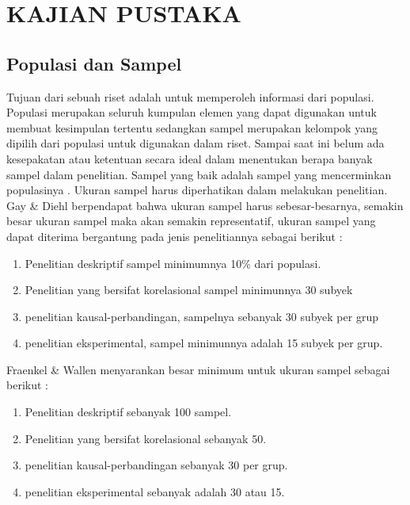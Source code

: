 
\chapter{KAJIAN PUSTAKA}                


\section{Populasi dan Sampel}
Tujuan dari sebuah riset adalah untuk memperoleh informasi dari populasi. Populasi merupakan seluruh kumpulan elemen yang dapat digunakan untuk membuat kesimpulan tertentu sedangkan sampel merupakan kelompok yang dipilih dari populasi untuk digunakan dalam riset. Sampai saat ini belum ada kesepakatan atau ketentuan secara ideal dalam menentukan berapa banyak sampel dalam penelitian. Sampel yang baik adalah sampel yang mencerminkan populasinya \citep{amirullah2015metode}. Ukuran sampel harus diperhatikan dalam melakukan penelitian. Gay \& Diehl berpendapat bahwa ukuran sampel harus sebesar-besarnya, semakin besar ukuran sampel maka akan semakin representatif, ukuran sampel yang dapat diterima bergantung pada jenis penelitiannya sebagai berikut \citep{gay1992research}:
\begin{enumerate}
	\item Penelitian deskriptif sampel minimumnya 10\% dari populasi.
	\item Penelitian yang bersifat korelasional sampel minimunnya 30 subyek
	\item penelitian kausal-perbandingan, sampelnya sebanyak 30 subyek per grup
	\item penelitian eksperimental, sampel minimunnya adalah 15 subyek per grup.
\end{enumerate}
Fraenkel \& Wallen menyarankan besar minimum untuk ukuran sampel sebagai berikut \citep{fraenkel2012design}:
\begin{enumerate}
	\item Penelitian deskriptif sebanyak 100 sampel.
	\item Penelitian yang bersifat korelasional sebanyak 50.
	\item penelitian kausal-perbandingan sebanyak 30 per grup.
	\item penelitian eksperimental sebanyak adalah 30 atau 15.
\end{enumerate}

